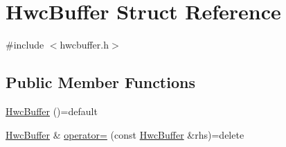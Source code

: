 \hypertarget{structHwcBuffer}{}\section{Hwc\+Buffer Struct Reference}
\label{structHwcBuffer}


{\ttfamily \#include $<$hwcbuffer.\+h$>$}

\subsection*{Public Member Functions}
\begin{DoxyCompactItemize}
\item 
\mbox{\hyperlink{structHwcBuffer_a51e8350e17e2fa84730c1b4feb83e33b}{Hwc\+Buffer}} ()=default
\item 
\mbox{\hyperlink{structHwcBuffer}{Hwc\+Buffer}} \& \mbox{\hyperlink{structHwcBuffer_a052afdbba36b220c5053ebb9c54992ce}{operator=}} (const \mbox{\hyperlink{structHwcBuffer}{Hwc\+Buffer}} \&rhs)=delete
\end{DoxyCompactItemize}
